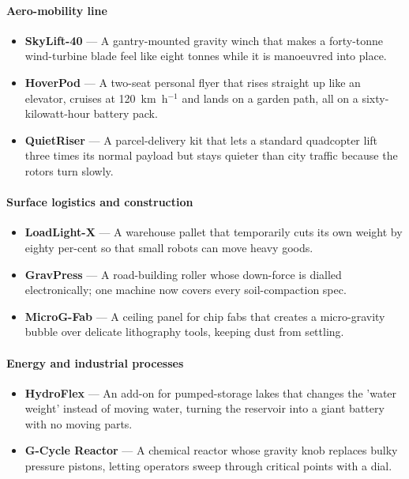 \documentclass[12pt,letterpaper]{book}
\begin{document}
\paragraph{Aero-mobility line}
\begin{itemize}
 \item \textbf{SkyLift-40} — A gantry-mounted gravity winch that makes a forty-tonne wind-turbine blade feel like eight tonnes while it is manoeuvred into place.
 \item \textbf{HoverPod} — A two-seat personal flyer that rises straight up like an elevator, cruises at 120~km~h$^{-1}$ and lands on a garden path, all on a sixty-kilowatt-hour battery pack.
 \item \textbf{QuietRiser} — A parcel-delivery kit that lets a standard quadcopter lift three times its normal payload but stays quieter than city traffic because the rotors turn slowly.
\end{itemize}

\paragraph{Surface logistics and construction}
\begin{itemize}
 \item \textbf{LoadLight-X} — A warehouse pallet that temporarily cuts its own weight by eighty per-cent so that small robots can move heavy goods.
 \item \textbf{GravPress} — A road-building roller whose down-force is dialled electronically; one machine now covers every soil-compaction spec.
 \item \textbf{MicroG-Fab} — A ceiling panel for chip fabs that creates a micro-gravity bubble over delicate lithography tools, keeping dust from settling.
\end{itemize}

\paragraph{Energy and industrial processes}
\begin{itemize}
 \item \textbf{HydroFlex} — An add-on for pumped-storage lakes that changes the 'water weight' instead of moving water, turning the reservoir into a giant battery with no moving parts.
 \item \textbf{G-Cycle Reactor} — A chemical reactor whose gravity knob replaces bulky pressure pistons, letting operators sweep through critical points with a dial.
\end{itemize}
\end{document}

